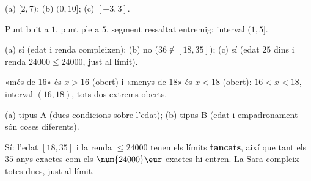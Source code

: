 \begin{solucions}
\begin{sollist}
  \item (a) $[2,7)$; \quad (b) $(0,10]$; \quad (c) $[-3,3]$.
  \item Punt buit a $1$, punt ple a $5$, segment ressaltat entremig: interval $(1,5]$.
  \item (a) sí (edat i renda compleixen); \quad (b) no ($36\notin[18,35]$); \quad
        (c) sí (edat $25$ dins i renda $\num{24000}\le\num{24000}$, just al límit).
  \item «més de $16$» és $x>16$ (obert) i «menys de $18$» és $x<18$ (obert):
        $16<x<18$, interval $(16,18)$, tots dos extrems oberts.
  \item (a) tipus A (dues condicions sobre l'edat); \quad (b) tipus B (edat i
        empadronament són coses diferents).
  \item Sí: l'edat $[18,35]$ i la renda $\le\num{24000}$ tenen els límits
        \textbf{tancats}, així que tant els $35$ anys exactes com els $\num{24000}\eur$
        exactes hi entren. La Sara compleix totes dues, just al límit.
\end{sollist}
\end{solucions}

